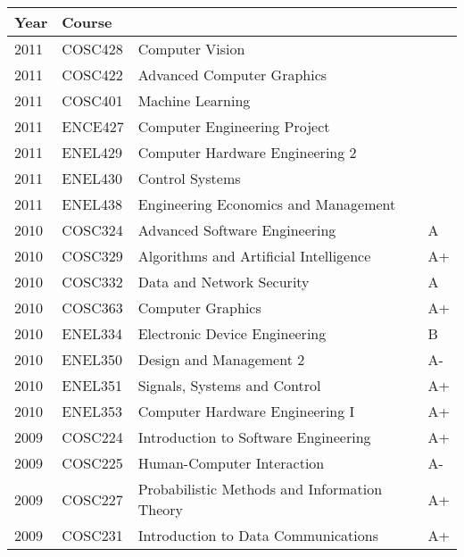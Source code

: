 \documentclass[10pt,a4]{article}
\begin{document}
\begin{parcolumns}[colwidths={1=0.3\textwidth}]{2}
{      \footnotesize
      \begin{tabularx}{0.7\textwidth}{llXl}
        \hline
        \textbf{Year} & \textbf{Course} & & \\
        \hline
        2011 & COSC428 & Computer Vision                                    &      \\
        2011 & COSC422 & Advanced Computer Graphics                         &      \\
        2011 & COSC401 & Machine Learning                                   &      \\
        2011 & ENCE427 & Computer Engineering Project                       &      \\
        2011 & ENEL429 & Computer Hardware Engineering 2                    &      \\
        2011 & ENEL430 & Control Systems                                    &      \\
        2011 & ENEL438 & Engineering Economics and Management               &      \\
        2010 & COSC324 & Advanced Software Engineering                      & A    \\
        2010 & COSC329 & Algorithms and Artificial Intelligence             & A+   \\
        2010 & COSC332 & Data and Network Security                          & A    \\
        2010 & COSC363 & Computer Graphics                                  & A+   \\
        2010 & ENEL334 & Electronic Device Engineering                      & B    \\
        2010 & ENEL350 & Design and Management 2                            & A-   \\
        2010 & ENEL351 & Signals, Systems and Control                       & A+   \\
        2010 & ENEL353 & Computer Hardware Engineering I                    & A+   \\
        2009 & COSC224 & Introduction to Software Engineering               & A+   \\
        2009 & COSC225 & Human-Computer Interaction                         & A-   \\
        2009 & COSC227 & Probabilistic Methods and Information Theory       & A+   \\
        2009 & COSC231 & Introduction to Data Communications                & A+   \\

\end{tabularx}}
\end{parcolumns}
\end{document}
